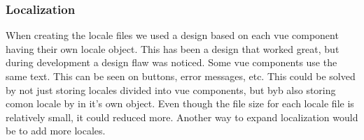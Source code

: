 \subsubsection{Localization}
When creating the locale files we used a design based on each vue component having their own locale object. This has been a design that worked great, but during development a design flaw was noticed. Some vue components use the same text. This can be seen on buttons, error messages, etc. This could be solved by not just storing locales divided into vue components, but byb also storing comon locale by in it's own object. Even though the file size for each locale file is relatively small, it could reduced more. Another way to expand localization would be to add more locales.